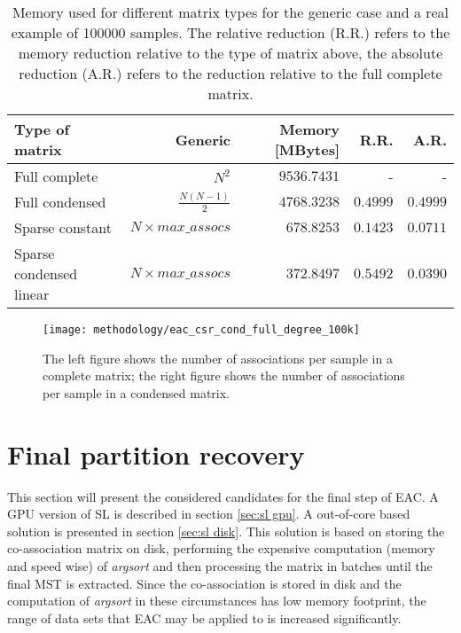 \begin{table}[hbtp]
\centering
\caption{Memory used for different matrix types for the generic case and a real example of 100000 samples. The relative reduction (R.R.) refers to the memory reduction relative to the type of matrix above, the absolute reduction (A.R.) refers to the reduction relative to the full complete matrix.}
\label{tab:mat type memory}
\begin{tabular}{lrrrr}
\toprule
\textbf{Type of matrix}          & \textbf{Generic}                & \textbf{Memory {[}MBytes{]}}    & \textbf{R.R.} & \textbf{A.R.} \\
\midrule%
Full complete           & $N^2$                  & $9536.7431$              & -                  & -             \\
Full condensed          & $\frac{N(N-1)}{2}$     & $4768.3238$              & $0.4999$     & $0.4999$      \\
Sparse constant         & $N \times max\_assocs$ & $678.8253$               & $0.1423$           & $0.0711$      \\
Sparse condensed linear & $N \times max\_assocs$ & $372.8497$               & $0.5492$           & $0.0390$      \\
\bottomrule
\end{tabular}
\end{table}


\begin{figure}[hbtp]
\centering
\texttt{[image: methodology/eac\_csr\_cond\_full\_degree\_100k]}
\caption{The left figure shows the number of associations per sample in a complete matrix; the right figure shows the number of associations per sample in a condensed matrix.}
\label{fig:coassoc degree}
\end{figure}


\section{Final partition recovery}

This section will present the considered candidates for the final step of EAC.
A GPU version of SL is described in section \ref{sec:sl gpu}.
A out-of-core based solution is presented in section \ref{sec:sl disk}.
This solution is based on storing the co-association matrix on disk, performing the expensive computation (memory and speed wise) of \emph{argsort} and then processing the matrix in batches until the final MST is extracted.
Since the co-association is stored in disk and the computation of \emph{argsort} in these circumstances has low memory footprint, the range of data sets that EAC may be applied to is increased significantly.

